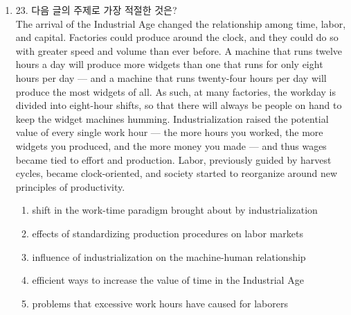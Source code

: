 \documentclass{article}
\begin{document}
\begin{enumerate}[label=\textbf{Q\arabic*.}]
\begin{enumerate}
  \item Effective conflict resolution depends mainly on strict group rules.
  \item Understanding emotions improves group communication and cooperation.
  \item Personal time away from the group best develops emotional skills.
  \item Suppressing negative emotions is the key to team productivity.
  \item Emotional self-expression should be avoided to prevent conflicts.
\end{enumerate}

\item
23. 다음 글의 주제로 가장 적절한 것은?
\\
The arrival of the Industrial Age changed the relationship among time,
labor, and capital. Factories could produce around the clock, and they
could do so with greater speed and volume than ever before. A machine that
runs twelve hours a day will produce more widgets than one that runs for
only eight hours per day — and a machine that runs twenty-four hours per
day will produce the most widgets of all. As such, at many factories, the
workday is divided into eight-hour shifts, so that there will always be
people on hand to keep the widget machines humming. Industrialization
raised the potential value of every single work hour — the more hours you
worked, the more widgets you produced, and the more money you made — and
thus wages became tied to effort and production. Labor, previously guided
by harvest cycles, became clock-oriented, and society started to reorganize
around new principles of productivity.

\begin{enumerate}
  \item shift in the work-time paradigm brought about by industrialization
  \item effects of standardizing production procedures on labor markets
  \item influence of industrialization on the machine-human relationship
  \item efficient ways to increase the value of time in the Industrial Age
  \item problems that excessive work hours have caused for laborers
\end{enumerate}


\end{enumerate}
\end{document}
